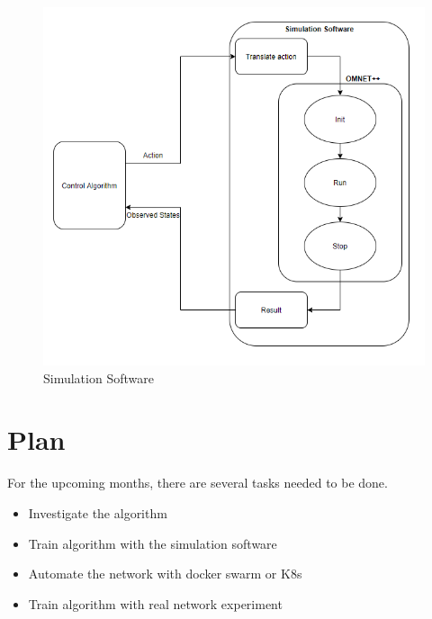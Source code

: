 \documentclass[conference]{IEEEtran}
\begin{document}
\begin{figure}[]
    \centering
        \includegraphics[scale = 0.5]{imgs/Simulation_software.png}
        \caption{Simulation Software}
        \label{fig:simulation_software}
    \end{figure}



\section{Plan}
\label{sec:Plan}
For the upcoming months, there are several tasks needed to be done.
\begin{itemize}
    \item Investigate the algorithm
    \item Train algorithm with the simulation software
    \item Automate the network with docker swarm or K8s
    \item Train algorithm with real network experiment
\end{itemize}




\end{document}
